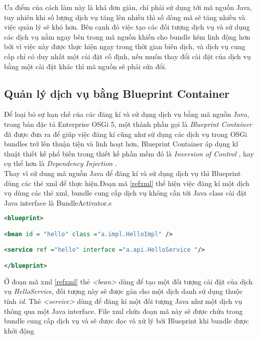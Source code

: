 Ưa điểm của cách làm này là khá đơn giản, chỉ phải sử dụng tới mã nguồn Java, tuy nhiên khi số lượng dịch vụ tăng lên nhiều thì số dòng mã sẽ tăng nhiều và việc quản lý sẽ khó hơn. Bên cạnh đó việc tạo các đối tượng dịch vụ và sử dụng các dịch vụ nằm ngay bên trong mã nguồn khiến cho bundle kém linh động hơn bởi vì việc này được thực hiện ngay trong thời gian biên dịch, và dịch vụ cung cấp chỉ có duy nhất một cài đặt cố định, nếu muốn thay đổi cài đặt của dịch vụ bằng một cài đặt khác thì mã nguồn sẽ phải sửa đổi.

\subsection{Quản lý dịch vụ bằng Blueprint Container}
Để loại bỏ sự hạn chế của các đăng kí và sử dụng dịch vụ bằng mã nguồn Java, trong bản đặc tả Enterprise OSGi 5, một thành phần gọi là  \textit{Blueprint Container} đã được đưa ra để giúp việc đăng kí cũng như sử dụng các dịch vụ trong OSGi bundles trở lên thuận tiện và linh hoạt hơn, Blueprint Container áp dụng kĩ thuật thiết kế phổ biến trong thiết kế phần mềm đó là \textit{Inversion of Control} \cite{ioc}, hay cụ thể hơn là \textit{Dependency Injection} \cite{di}.\\

Thay vì sử dung mã nguồn Java để đăng kí và sử dụng dịch vụ thì Blueprint dùng các thẻ xml để thực hiện.Đoạn mã \ref{refxml} thể hiện việc đăng kí một dịch vụ dùng các thẻ xml, bundle cung cấp dịch vụ không cần tới Java class cài đặt Java interface là {BundleActivator}.s
\begin{lstlisting}[label=refxml, 
inputencoding=utf8,
breaklines=true,
language=xml,
basicstyle=\ttfamily\footnotesize,
caption=Đăng kí dịch vụ dùng Blueprint]
<blueprint>

<bean id = "hello" class ="a.impl.HelloImpl" />

<service ref ="hello" interface ="a.api.HelloService "/>

</blueprint>
\end{lstlisting}
 
Ở đoạn mã xml \ref{refxml} thẻ \textit{<bean>} dùng để tạo một đối tượng cài đặt của dịch vụ \textit{HelloService}, đối tượng này sẽ được gán cho một dịch danh sử dụng thuộc tính \textit{id}. Thẻ \textit{<service>} dùng để đăng kí một đối tượng Java như một dịch vụ thông qua một Java interface. File xml chứa đoạn mã này sẽ được chứa trong bundle cung cấp dịch vụ và sẽ được đọc và xử lý bởi Blueprint khi bundle được khởi động\\

